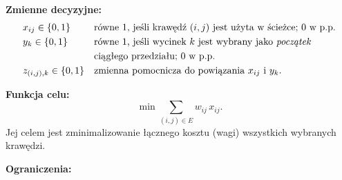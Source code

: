 \documentclass[12pt]{article}
\begin{document}
\noindent \textbf{Zmienne decyzyjne:}
\begin{align*}
	 & x_{ij} \in \{0,1\}
	 &                         & \text{równe }1\text{, jeśli krawędź }(i,j)\text{ jest użyta w ścieżce; }0\text{ w p.p.}                                               \\
	 & y_{k} \in \{0,1\}
	 &                         & \text{równe }1\text{, jeśli wycinek }k \text{ jest wybrany jako \emph{początek} }                                                     \\
	 &                         &                                                                                         & \text{ciągłego przedziału; }0\text{ w p.p.} \\
	 & z_{(i,j),k} \in \{0,1\}
	 &                         & \text{zmienna pomocnicza do powiązania }x_{ij} \text{ i } y_k.
\end{align*}

\vspace{2em}

\noindent \textbf{Funkcja celu:}
\[
	\min \sum_{(i,j)\in E} w_{ij} \, x_{ij}.
\]
Jej celem jest zminimalizowanie łącznego kosztu (wagi) wszystkich wybranych krawędzi.

\vspace{2em}

\noindent \textbf{Ograniczenia:}
\end{document}

